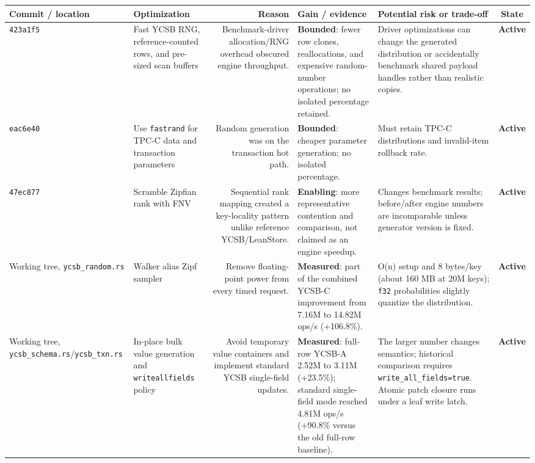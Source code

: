 \documentclass[10pt,a4paper,landscape]{article}
\newcommand{\code}[1]{\texttt{#1}}
\newcommand{\commit}[1]{\code{#1}}
\newcommand{\gainmeasured}{\textbf{Measured}}
\newcommand{\gainbounded}{\textbf{Bounded}}
\newcommand{\gainenabling}{\textbf{Enabling}}
\newcommand{\stateactive}{\textbf{Active}}
\begin{document}
\begin{longtable}{IORGKS}
\toprule
\textbf{Commit / location} & \textbf{Optimization} & \textbf{Reason} &
\textbf{Gain / evidence} & \textbf{Potential risk or trade-off} & \textbf{State} \\
\midrule
\endhead
\commit{423a1f5} & Fast YCSB RNG, reference-counted rows, and pre-sized scan buffers &
Benchmark-driver allocation/RNG overhead obscured engine throughput. & \gainbounded: fewer
row clones, reallocations, and expensive random-number operations; no isolated percentage
retained. & Driver optimizations can change the generated distribution or accidentally
benchmark shared payload handles rather than realistic copies. & \stateactive \\

\commit{eac6e40} & Use \code{fastrand} for TPC-C data and transaction parameters & Random
generation was on the transaction hot path. & \gainbounded: cheaper parameter generation; no
isolated percentage. & Must retain TPC-C distributions and invalid-item rollback rate. &
\stateactive \\

\commit{47ec877} & Scramble Zipfian rank with FNV & Sequential rank mapping created a
key-locality pattern unlike reference YCSB/LeanStore. & \gainenabling: more representative
contention and comparison, not claimed as an engine speedup. & Changes benchmark results;
before/after engine numbers are incomparable unless generator version is fixed. & \stateactive \\

Working tree, \code{ycsb\_random.rs} & Walker alias Zipf sampler & Remove floating-point
power from every timed request. & \gainmeasured: part of the combined YCSB-C improvement
from 7.16M to 14.82M ops/s (+106.8\%). & O(n) setup and 8 bytes/key (about 160 MB at 20M
keys); \code{f32} probabilities slightly quantize the distribution. & \stateactive \\

Working tree, \code{ycsb\_schema.rs}/\code{ycsb\_txn.rs} & In-place bulk value generation
and \code{writeallfields} policy & Avoid temporary value containers and implement standard
YCSB single-field updates. & \gainmeasured: full-row YCSB-A 2.52M to 3.11M (+23.5\%);
standard single-field mode reached 4.81M ops/s (+90.8\% versus the old full-row baseline).
& The larger number changes semantics; historical comparison requires
\code{write\_all\_fields=true}. Atomic patch closure runs under a leaf write latch. &
\stateactive \\


\end{longtable}
\end{document}
